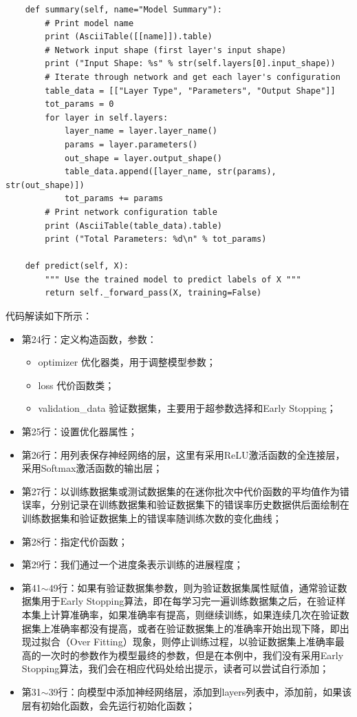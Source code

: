 \documentclass[UTF8]{article}
\begin{document}
\begin{lstlisting}
    def summary(self, name="Model Summary"):
        # Print model name
        print (AsciiTable([[name]]).table)
        # Network input shape (first layer's input shape)
        print ("Input Shape: %s" % str(self.layers[0].input_shape))
        # Iterate through network and get each layer's configuration
        table_data = [["Layer Type", "Parameters", "Output Shape"]]
        tot_params = 0
        for layer in self.layers:
            layer_name = layer.layer_name()
            params = layer.parameters()
            out_shape = layer.output_shape()
            table_data.append([layer_name, str(params), str(out_shape)])
            tot_params += params
        # Print network configuration table
        print (AsciiTable(table_data).table)
        print ("Total Parameters: %d\n" % tot_params)

    def predict(self, X):
        """ Use the trained model to predict labels of X """
        return self._forward_pass(X, training=False)
\end{lstlisting}
代码解读如下所示：
\begin{itemize}
\item 第24行：定义构造函数，参数：
	\begin{itemize}
	\item optimizer 优化器类，用于调整模型参数；
	\item loss 代价函数类；
	\item validation\_data 验证数据集，主要用于超参数选择和Early Stopping；
	\end{itemize}
\item 第25行：设置优化器属性；
\item 第26行：用列表保存神经网络的层，这里有采用ReLU激活函数的全连接层，采用Softmax激活函数的输出层；
\item 第27行：以训练数据集或测试数据集的在迷你批次中代价函数的平均值作为错误率，分别记录在训练数据集和验证数据集下的错误率历史数据供后面绘制在训练数据集和验证数据集上的错误率随训练次数的变化曲线；
\item 第28行：指定代价函数；
\item 第29行：我们通过一个进度条表示训练的进展程度；
\item 第41$\sim$49行：如果有验证数据集参数，则为验证数据集属性赋值，通常验证数据集用于Early Stopping算法，即在每学习完一遍训练数据集之后，在验证样本集上计算准确率，如果准确率有提高，则继续训练，如果连续几次在验证数据集上准确率都没有提高，或者在验证数据集上的准确率开始出现下降，即出现过拟合（Over Fitting）现象，则停止训练过程，以验证数据集上准确率最高的一次时的参数作为模型最终的参数，但是在本例中，我们没有采用Early Stopping算法，我们会在相应代码处给出提示，读者可以尝试自行添加；
\item 第31$\sim$39行：向模型中添加神经网络层，添加到layers列表中，添加前，如果该层有初始化函数，会先运行初始化函数；
\end{itemize}
\end{document}
